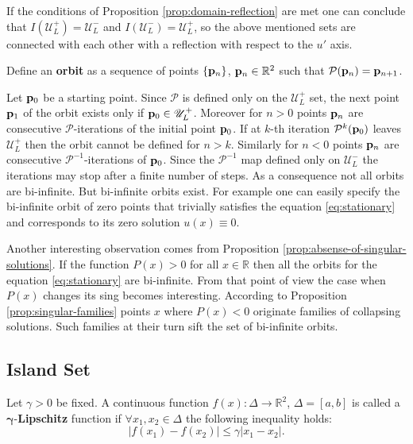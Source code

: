 If the conditions of Proposition \ref{prop:domain-reflection} are met one can conclude that $I (\mathscr{U}_L^+) = \mathscr{U}_L^-$ and $I (\mathscr{U}_L^-) = \mathscr{U}_L^+$, so the above mentioned sets are connected with each other with a reflection with respect to the $u'$ axis.

\begin{definition}
	Define an {\bf orbit} as a sequence of points $\{ \vb{p}_n \}$, $\vb{p}_n \in \mathbb{R}^2$ such that $\mathcal{P}(\vb{p}_n) = \vb{p}_{n+1}$.
\label{def:orbit}
\end{definition}

Let $\vb{p}_0$ be a starting point.
Since $\mathcal{P}$ is defined only on the $\mathscr{U}_L^+$ set, the next point $\vb{p}_1$ of the orbit exists only if $\vb{p}_0 \in \mathscr{U}_L^+$.
Moreover for $n > 0$ points $\vb{p}_n$ are consecutive $\mathcal{P}$-iterations of the initial point $\vb{p}_0$.
If at $k$-th iteration $\mathcal{P}^k(\vb{p}_0)$ leaves $\mathscr{U}_L^+$ then the orbit cannot be defined for $n > k$.
Similarly for $n < 0$ points $\vb{p}_n$ are consecutive $\mathcal{P}^{-1}$-iterations of $\vb{p}_0$.
Since the $\mathcal{P}^{-1}$ map defined only on $\mathscr{U}_L^-$ the iterations may stop after a finite number of steps.
As a consequence not all orbits are bi-infinite.
But bi-infinite orbits exist.
For example one can easily specify the bi-infinite orbit of zero points that trivially satisfies the equation \eqref{eq:stationary} and corresponds to its zero solution $u(x) \equiv 0$.

Another interesting observation comes from Proposition \ref{prop:absense-of-singular-solutions}.
If the function $P(x) > 0$ for all $x \in \mathbb{R}$ then all the orbits for the equation \eqref{eq:stationary} are bi-infinite.
From that point of view the case when $P(x)$ changes its sing becomes interesting.
According to Proposition \ref{prop:singular-families} points $x$ where $P(x) < 0$ originate families of collapsing solutions.
Such families at their turn sift the set of bi-infinite orbits.

\subsection{Island Set}

\begin{definition}
	Let $\gamma > 0$ be fixed.
	A continuous function $f(x): \Delta \to \mathbb{R}^2$, $\Delta = [a, b]$ is called a $\bm{\gamma}$-{\bf Lipschitz} function if $\forall x_1, x_2 \in \Delta$ the following inequality holds:
	\begin{equation}
		|f(x_1) - f(x_2)| \le \gamma |x_1 - x_2|.
	\end{equation}
\end{definition}

